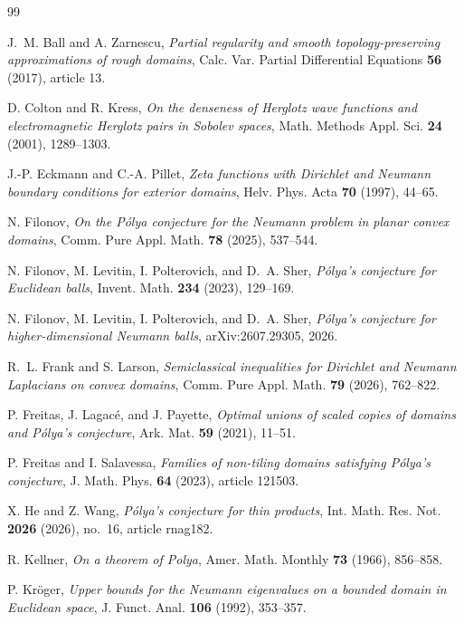 \documentclass[11pt]{amsart}
\numberwithin{equation}{section}
\begin{document}
\begin{thebibliography}{99}

J.~M. Ball and A. Zarnescu,
\emph{Partial regularity and smooth topology-preserving approximations
of rough domains}, Calc. Var. Partial Differential Equations
\textbf{56} (2017), article 13.

D. Colton and R. Kress,
\emph{On the denseness of Herglotz wave functions and electromagnetic
Herglotz pairs in Sobolev spaces}, Math. Methods Appl. Sci.
\textbf{24} (2001), 1289--1303.

J.-P. Eckmann and C.-A. Pillet,
\emph{Zeta functions with Dirichlet and Neumann boundary conditions
for exterior domains}, Helv. Phys. Acta \textbf{70} (1997), 44--65.

N. Filonov,
\emph{On the P\'olya conjecture for the Neumann problem in planar convex
domains}, Comm. Pure Appl. Math. \textbf{78} (2025), 537--544.

N. Filonov, M. Levitin, I. Polterovich, and D.~A. Sher,
\emph{P\'olya's conjecture for Euclidean balls}, Invent. Math.
\textbf{234} (2023), 129--169.

N. Filonov, M. Levitin, I. Polterovich, and D.~A. Sher,
\emph{P\'olya's conjecture for higher-dimensional Neumann balls},
arXiv:2607.29305, 2026.

R.~L. Frank and S. Larson,
\emph{Semiclassical inequalities for Dirichlet and Neumann Laplacians
on convex domains}, Comm. Pure Appl. Math. \textbf{79} (2026), 762--822.

P. Freitas, J. Lagac\'e, and J. Payette,
\emph{Optimal unions of scaled copies of domains and P\'olya's conjecture},
Ark. Mat. \textbf{59} (2021), 11--51.

P. Freitas and I. Salavessa,
\emph{Families of non-tiling domains satisfying P\'olya's conjecture},
J. Math. Phys. \textbf{64} (2023), article 121503.

X. He and Z. Wang,
\emph{P\'olya's conjecture for thin products},
Int. Math. Res. Not. \textbf{2026} (2026), no.~16, article rnag182.

R. Kellner, \emph{On a theorem of Polya}, Amer. Math. Monthly
\textbf{73} (1966), 856--858.

P. Kr\"oger,
\emph{Upper bounds for the Neumann eigenvalues on a bounded domain
in Euclidean space}, J. Funct. Anal. \textbf{106} (1992), 353--357.


\end{thebibliography}
\end{document}
